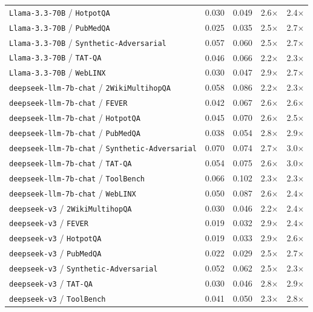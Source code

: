 \begin{longtable}{lcccc}
\texttt{Llama-3.3-70B} / \texttt{HotpotQA} & 0.030 & 0.049 & 2.6$\times$ & 2.4$\times$ \\
\texttt{Llama-3.3-70B} / \texttt{PubMedQA} & 0.025 & 0.035 & 2.5$\times$ & 2.7$\times$ \\
\texttt{Llama-3.3-70B} / \texttt{Synthetic-Adversarial} & 0.057 & 0.060 & 2.5$\times$ & 2.7$\times$ \\
\texttt{Llama-3.3-70B} / \texttt{TAT-QA} & 0.046 & 0.066 & 2.2$\times$ & 2.3$\times$ \\
\texttt{Llama-3.3-70B} / \texttt{WebLINX} & 0.030 & 0.047 & 2.9$\times$ & 2.7$\times$ \\
\texttt{deepseek-llm-7b-chat} / \texttt{2WikiMultihopQA} & 0.058 & 0.086 & 2.2$\times$ & 2.3$\times$ \\
\texttt{deepseek-llm-7b-chat} / \texttt{FEVER} & 0.042 & 0.067 & 2.6$\times$ & 2.6$\times$ \\
\texttt{deepseek-llm-7b-chat} / \texttt{HotpotQA} & 0.045 & 0.070 & 2.6$\times$ & 2.5$\times$ \\
\texttt{deepseek-llm-7b-chat} / \texttt{PubMedQA} & 0.038 & 0.054 & 2.8$\times$ & 2.9$\times$ \\
\texttt{deepseek-llm-7b-chat} / \texttt{Synthetic-Adversarial} & 0.070 & 0.074 & 2.7$\times$ & 3.0$\times$ \\
\texttt{deepseek-llm-7b-chat} / \texttt{TAT-QA} & 0.054 & 0.075 & 2.6$\times$ & 3.0$\times$ \\
\texttt{deepseek-llm-7b-chat} / \texttt{ToolBench} & 0.066 & 0.102 & 2.3$\times$ & 2.3$\times$ \\
\texttt{deepseek-llm-7b-chat} / \texttt{WebLINX} & 0.050 & 0.087 & 2.6$\times$ & 2.4$\times$ \\
\texttt{deepseek-v3} / \texttt{2WikiMultihopQA} & 0.030 & 0.046 & 2.2$\times$ & 2.4$\times$ \\
\texttt{deepseek-v3} / \texttt{FEVER} & 0.019 & 0.032 & 2.9$\times$ & 2.4$\times$ \\
\texttt{deepseek-v3} / \texttt{HotpotQA} & 0.019 & 0.033 & 2.9$\times$ & 2.6$\times$ \\
\texttt{deepseek-v3} / \texttt{PubMedQA} & 0.022 & 0.029 & 2.5$\times$ & 2.7$\times$ \\
\texttt{deepseek-v3} / \texttt{Synthetic-Adversarial} & 0.052 & 0.062 & 2.5$\times$ & 2.3$\times$ \\
\texttt{deepseek-v3} / \texttt{TAT-QA} & 0.030 & 0.046 & 2.8$\times$ & 2.9$\times$ \\
\texttt{deepseek-v3} / \texttt{ToolBench} & 0.041 & 0.050 & 2.3$\times$ & 2.8$\times$ \\

\end{longtable}
